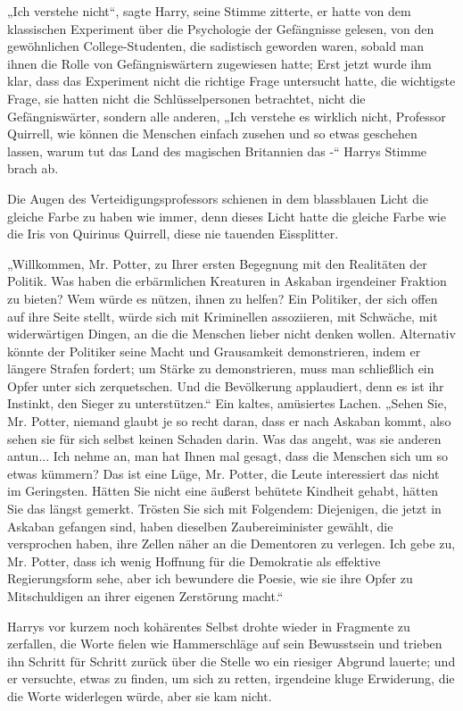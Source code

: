 {„Ich verstehe nicht“, sagte Harry, seine Stimme zitterte, er hatte von dem klassischen Experiment über die Psychologie der Gefängnisse gelesen, von den gewöhnlichen College-Studenten, die sadistisch geworden waren, sobald man ihnen die Rolle von Gefängniswärtern zugewiesen hatte; Erst jetzt wurde ihm klar, dass das Experiment nicht die richtige Frage untersucht hatte, die wichtigste Frage, sie hatten nicht die Schlüsselpersonen betrachtet, nicht die Gefängniswärter, sondern alle anderen, „Ich verstehe es wirklich nicht, Professor Quirrell, wie können die Menschen einfach zusehen und so etwas geschehen lassen, warum tut das Land des magischen Britannien das -“ Harrys Stimme brach ab.

Die Augen des Verteidigungsprofessors schienen in dem blassblauen Licht die gleiche Farbe zu haben wie immer, denn dieses Licht hatte die gleiche Farbe wie die Iris von Quirinus Quirrell, diese nie tauenden Eissplitter.

„Willkommen, Mr. Potter, zu Ihrer ersten Begegnung mit den Realitäten der Politik. Was haben die erbärmlichen Kreaturen in Askaban irgendeiner Fraktion zu bieten? Wem würde es nützen, ihnen zu helfen? Ein Politiker, der sich offen auf ihre Seite stellt, würde sich mit Kriminellen assoziieren, mit Schwäche, mit widerwärtigen Dingen, an die die Menschen lieber nicht denken wollen. Alternativ könnte der Politiker seine Macht und Grausamkeit demonstrieren, indem er längere Strafen fordert; um Stärke zu demonstrieren, muss man schließlich ein Opfer unter sich zerquetschen. Und die Bevölkerung applaudiert, denn es ist ihr Instinkt, den Sieger zu unterstützen.“ Ein kaltes, amüsiertes Lachen. „Sehen Sie, Mr. Potter, niemand glaubt je so recht daran, dass er nach Askaban kommt, also sehen sie für sich selbst keinen Schaden darin. Was das angeht, was sie anderen antun... Ich nehme an, man hat Ihnen mal gesagt, dass die Menschen sich um so etwas kümmern? Das ist eine Lüge, Mr. Potter, die Leute interessiert das nicht im Geringsten. Hätten Sie nicht eine äußerst behütete Kindheit gehabt, hätten Sie das längst gemerkt. Trösten Sie sich mit Folgendem: Diejenigen, die jetzt in Askaban gefangen sind, haben dieselben Zaubereiminister gewählt, die versprochen haben, ihre Zellen näher an die Dementoren zu verlegen. Ich gebe zu, Mr. Potter, dass ich wenig Hoffnung für die Demokratie als effektive Regierungsform sehe, aber ich bewundere die Poesie, wie sie ihre Opfer zu Mitschuldigen an ihrer eigenen Zerstörung macht.“

Harrys vor kurzem noch kohärentes Selbst drohte wieder in Fragmente zu zerfallen, die Worte fielen wie Hammerschläge auf sein Bewusstsein und trieben ihn Schritt für Schritt zurück über die Stelle wo ein riesiger Abgrund lauerte; und er versuchte, etwas zu finden, um sich zu retten, irgendeine kluge Erwiderung, die die Worte widerlegen würde, aber sie kam nicht.

}
